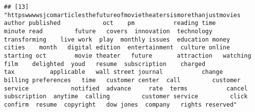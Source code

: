 \documentclass[
]{article}
\begin{document}
\begin{verbatim}
## [13] "httpswwwwsjcomarticlesthefutureofmovietheatersismorethanjustmovies author published            oct    pm           reading time           minute read         future   covers  innovation  technology transforming    live work  play  monthly issues  education money cities    month   digital edition  entertainment  culture online starting oct        movie theater   future       attraction   watching  film    delighted  youd   resume  subscription    charged           tax          applicable   wall street journal           change  billing preferences   time   customer center  call         customer service            notified  advance     rate  terms           cancel  subscription  anytime  calling         customer service         click confirm  resume  copyright   dow jones  company   rights reserved"                                                                                                                                                                                                                                                                                                                                                                                                                                                                                                                                                                                                                                                                                                                                                                                                                                                                                                                                                                                                                                                                                                                                                                                                                                                                                                                                                                                                                                                                                                                                                                                                                                                                                                                                                                                                                                                                                                                                                                                                                                                                                                                                                                                                                                                                                                                                                                                                                                                                                                                                                                                                       
\end{verbatim}
\end{document}
